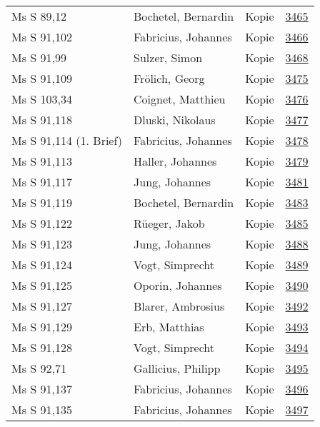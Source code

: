 \documentclass[10pt,a4paper,landscape]{report}
\begin{document}
\begin{longtable}{p{16cm}p{4cm}lr}
Ms S 89,12	&	Bochetel, Bernardin	&	Kopie	&	\href{http://130.60.24.72/assignment/3465}{3465}\\
Ms S 91,102	&	Fabricius, Johannes	&	Kopie	&	\href{http://130.60.24.72/assignment/3466}{3466}\\
Ms S 91,99	&	Sulzer, Simon	&	Kopie	&	\href{http://130.60.24.72/assignment/3468}{3468}\\
Ms S 91,109	&	Frölich, Georg	&	Kopie	&	\href{http://130.60.24.72/assignment/3475}{3475}\\
Ms S 103,34	&	Coignet, Matthieu	&	Kopie	&	\href{http://130.60.24.72/assignment/3476}{3476}\\
Ms S 91,118	&	Dluski, Nikolaus	&	Kopie	&	\href{http://130.60.24.72/assignment/3477}{3477}\\
Ms S 91,114 (1. Brief)	&	Fabricius, Johannes	&	Kopie	&	\href{http://130.60.24.72/assignment/3478}{3478}\\
Ms S 91,113	&	Haller, Johannes	&	Kopie	&	\href{http://130.60.24.72/assignment/3479}{3479}\\
Ms S 91,117	&	Jung, Johannes	&	Kopie	&	\href{http://130.60.24.72/assignment/3481}{3481}\\
Ms S 91,119	&	Bochetel, Bernardin	&	Kopie	&	\href{http://130.60.24.72/assignment/3483}{3483}\\
Ms S 91,122	&	Rüeger, Jakob	&	Kopie	&	\href{http://130.60.24.72/assignment/3485}{3485}\\
Ms S 91,123	&	Jung, Johannes	&	Kopie	&	\href{http://130.60.24.72/assignment/3488}{3488}\\
Ms S 91,124	&	Vogt, Simprecht	&	Kopie	&	\href{http://130.60.24.72/assignment/3489}{3489}\\
Ms S 91,125	&	Oporin, Johannes	&	Kopie	&	\href{http://130.60.24.72/assignment/3490}{3490}\\
Ms S 91,127	&	Blarer, Ambrosius	&	Kopie	&	\href{http://130.60.24.72/assignment/3492}{3492}\\
Ms S 91,129	&	Erb, Matthias	&	Kopie	&	\href{http://130.60.24.72/assignment/3493}{3493}\\
Ms S 91,128	&	Vogt, Simprecht	&	Kopie	&	\href{http://130.60.24.72/assignment/3494}{3494}\\
Ms S 92,71	&	Gallicius, Philipp	&	Kopie	&	\href{http://130.60.24.72/assignment/3495}{3495}\\
Ms S 91,137	&	Fabricius, Johannes	&	Kopie	&	\href{http://130.60.24.72/assignment/3496}{3496}\\
Ms S 91,135	&	Fabricius, Johannes	&	Kopie	&	\href{http://130.60.24.72/assignment/3497}{3497}\\

\end{longtable}
\end{document}
